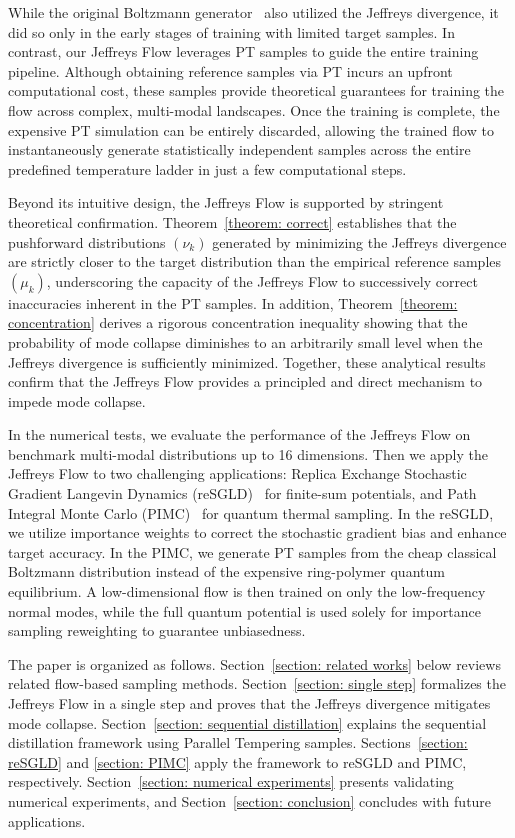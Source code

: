 \documentclass[%
 reprint,
 amsmath,amssymb,
 aps,
 pre,
]{revtex4-2}
\begin{document}
While the original Boltzmann generator~\cite{noe2019boltzmann} also utilized the Jeffreys divergence, it did so only in the early stages of training with limited target samples. In contrast, our Jeffreys Flow leverages PT samples to guide the entire training pipeline. Although obtaining reference samples via PT incurs an upfront computational cost, these samples provide theoretical guarantees for training the flow across complex, multi-modal landscapes. Once the training is complete, the expensive PT simulation can be entirely discarded, allowing the trained flow to instantaneously generate statistically independent samples across the entire predefined temperature ladder in just a few computational steps.

Beyond its intuitive design, the Jeffreys Flow is supported by stringent theoretical confirmation. Theorem~\ref{theorem: correct} establishes that the pushforward distributions $(\nu_k)$ generated by minimizing the Jeffreys divergence are strictly closer to the target distribution than the empirical reference samples $(\mu_k)$, underscoring the capacity of the Jeffreys Flow to successively correct inaccuracies inherent in the PT samples. In addition, Theorem~\ref{theorem: concentration} derives a rigorous concentration inequality showing that the probability of mode collapse diminishes to an arbitrarily small level when the Jeffreys divergence is sufficiently minimized. Together, these analytical results confirm that the Jeffreys Flow provides a principled and direct mechanism to impede mode collapse.

In the numerical tests, we evaluate the performance of the Jeffreys Flow on benchmark multi-modal distributions up to 16 dimensions. Then we apply the Jeffreys Flow to two challenging applications: Replica Exchange Stochastic Gradient Langevin Dynamics (reSGLD)~\cite{deng2020accelerating,li2023fast,lin2023b} for finite-sum potentials, and Path Integral Monte Carlo (PIMC)~\cite{herman1982path,marx1996ab,ceriotti2010efficient,schoof2011configuration} for quantum thermal sampling. In the reSGLD, we utilize importance weights to correct the stochastic gradient bias and enhance target accuracy. In the PIMC, we generate PT samples from the cheap classical Boltzmann distribution instead of the expensive ring-polymer quantum equilibrium. A low-dimensional flow is then trained on only the low-frequency normal modes, while the full quantum potential is used solely for importance sampling reweighting to guarantee unbiasedness.

The paper is organized as follows. Section~\ref{section: related works} below reviews related flow-based sampling methods. Section~\ref{section: single step} formalizes the Jeffreys Flow in a single step and proves that the Jeffreys divergence mitigates mode collapse. Section~\ref{section: sequential distillation} explains the sequential distillation framework using Parallel Tempering samples. Sections~\ref{section: reSGLD} and \ref{section: PIMC} apply the framework to reSGLD and PIMC, respectively. Section~\ref{section: numerical experiments} presents validating numerical experiments, and Section~\ref{section: conclusion} concludes with future applications.
\end{document}
